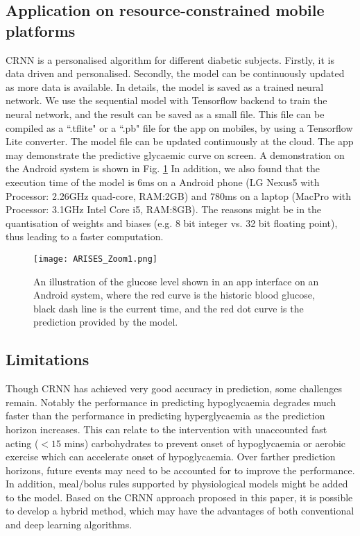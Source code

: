 \documentclass[a4paper, 10 pt, twocolumn]{IEEEtran}
\begin{document}
\subsection{ {Application on resource-constrained mobile platforms}}
CRNN is a personalised algorithm for different diabetic subjects. Firstly, it is data driven and personalised. Secondly, the model can be continuously updated as more data is available. In details, the model is saved as a
trained neural network. We use the sequential model with Tensorflow backend to train the neural network, and the result can be saved as a small file. {This file can be compiled as a ``.tflite" or a ``.pb" file for the app
on mobiles, by using a Tensorflow Lite converter. The model file can be updated continuously at the cloud.} The app may demonstrate the predictive glycaemic curve on screen. A demonstration on the Android system is shown
in Fig. \ref{fig_E} In addition, we also found that the execution time of the model is $6$ms on a Android phone (LG Nexus5 with Processor: 2.26GHz quad-core, RAM:2GB) and $780$ms on a laptop (MacPro with Processor: 3.1GHz
Intel Core i5, RAM:8GB). The reasons might be in the quantisation of weights and biases (e.g. 8 bit integer vs. 32 bit floating point), thus leading to a faster computation.

\begin{figure}[!ht]
     \centering
            \texttt{[image: ARISES\_Zoom1.png]}
             \caption{An illustration of the glucose level shown in an app interface on an Android system, where the red curve is the historic blood glucose, black dash line is the current time, and the red dot curve is
             the prediction provided by the model.}\label{fig_E}
\end{figure}

\subsection{Limitations}
Though CRNN has achieved very good accuracy in prediction, some challenges remain. Notably the performance in predicting hypoglycaemia degrades much faster than the performance in predicting hyperglycaemia as the
prediction horizon increases. This can relate to the intervention with unaccounted fast acting  {($<15$ mins)} carbohydrates to prevent onset of hypoglycaemia or aerobic exercise which can accelerate onset of
hypoglycaemia. Over farther prediction horizons, future events may need to be accounted for to improve the performance.
In addition,  {meal/bolus rules supported by physiological models might be added to the model.}
Based on the CRNN approach proposed in this paper, it is possible to develop a hybrid method, which may have the advantages of both conventional and  {deep learning} algorithms.
\end{document}
